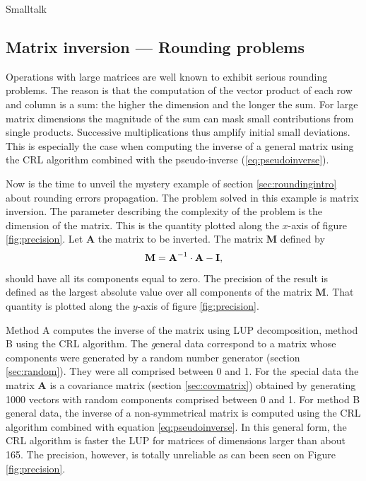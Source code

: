 \begin{displaycode}{Smalltalk}
\subsection{Matrix inversion --- Rounding problems}
\label{sec:matrixrounding} Operations with large matrices are well
known to exhibit serious rounding problems. The reason is that the
computation of the vector product of each row and column is a sum:
the higher the dimension and the longer the sum. For large matrix
dimensions the magnitude of the sum can mask small contributions
from single products. Successive multiplications thus amplify
initial small deviations. This is especially the case when
computing the inverse of a general matrix using the CRL algorithm
combined with the pseudo-inverse (\ref{eq:pseudoinverse}).

Now is the time to unveil the mystery example of section
\ref{sec:roundingintro} about rounding errors propagation. The
problem solved in this example is matrix inversion. The parameter
describing the complexity of the problem is the dimension of the
matrix. This is the quantity plotted along the $x$-axis of figure
\ref{fig:precision}. Let $\textbf{A}$ the matrix to be inverted. The
matrix $\textbf{M}$ defined by
\begin{equation}
  \textbf{M}=\textbf{A}^{-1}\cdot\textbf{A}-\textbf{I},
\end{equation}
should have all its components equal to zero. The precision of the
result is defined as the largest absolute value over all
components of the matrix $\textbf{M}$. That quantity is plotted along
the $y$-axis of figure \ref{fig:precision}.

Method A computes the inverse of the matrix using LUP
decomposition, method B using the CRL algorithm. The {\textsl general}
data correspond to a matrix whose components were generated by a
random number generator (\cf section \ref{sec:random}). They were
all comprised between 0 and 1. For the {\textsl special} data the
matrix $\textbf{A}$ is a covariance matrix (\cf section
\ref{sec:covmatrix}) obtained by generating 1000 vectors with
random components comprised between 0 and 1. For method B general
data, the inverse of a non-symmetrical matrix is computed using
the CRL algorithm combined with equation \ref{eq:pseudoinverse}.
In this general form, the CRL algorithm is faster the LUP for
matrices of dimensions larger than about 165. The precision,
however, is totally unreliable as can been seen on Figure
\ref{fig:precision}.


\end{displaycode}
